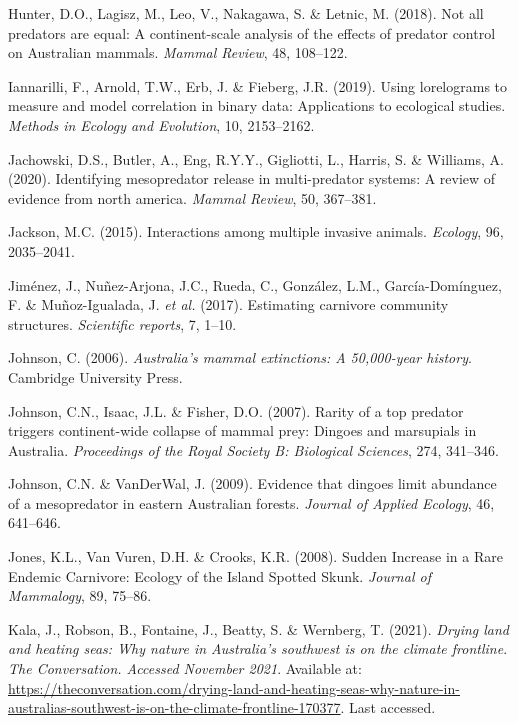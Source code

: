 \documentclass[11pt,a4paper,titlepage,twoside,openright]{style/unimelbthesis}
\begin{document}
\begin{mainmatter}
\leavevmode\hypertarget{ref-hunter2018not}{}%
Hunter, D.O., Lagisz, M., Leo, V., Nakagawa, S. \& Letnic, M. (2018). Not all predators are equal: A continent-scale analysis of the effects of predator control on Australian mammals. \emph{Mammal Review}, 48, 108--122.

\leavevmode\hypertarget{ref-iannarilli2019lorelograms}{}%
Iannarilli, F., Arnold, T.W., Erb, J. \& Fieberg, J.R. (2019). Using lorelograms to measure and model correlation in binary data: Applications to ecological studies. \emph{Methods in Ecology and Evolution}, 10, 2153--2162.

\leavevmode\hypertarget{ref-jachowski2020identifying}{}%
Jachowski, D.S., Butler, A., Eng, R.Y.Y., Gigliotti, L., Harris, S. \& Williams, A. (2020). Identifying mesopredator release in multi-predator systems: A review of evidence from north america. \emph{Mammal Review}, 50, 367--381.

\leavevmode\hypertarget{ref-jackson2015interactions}{}%
Jackson, M.C. (2015). Interactions among multiple invasive animals. \emph{Ecology}, 96, 2035--2041.

\leavevmode\hypertarget{ref-jimenez2017estimating}{}%
Jiménez, J., Nuñez-Arjona, J.C., Rueda, C., González, L.M., García-Domínguez, F. \& Muñoz-Igualada, J. \emph{et al.} (2017). Estimating carnivore community structures. \emph{Scientific reports}, 7, 1--10.

\leavevmode\hypertarget{ref-johnson2006australia}{}%
Johnson, C. (2006). \emph{Australia's mammal extinctions: A 50,000-year history}. Cambridge University Press.

\leavevmode\hypertarget{ref-johnson2007rarity}{}%
Johnson, C.N., Isaac, J.L. \& Fisher, D.O. (2007). Rarity of a top predator triggers continent-wide collapse of mammal prey: Dingoes and marsupials in Australia. \emph{Proceedings of the Royal Society B: Biological Sciences}, 274, 341--346.

\leavevmode\hypertarget{ref-johnson2009evidence}{}%
Johnson, C.N. \& VanDerWal, J. (2009). Evidence that dingoes limit abundance of a mesopredator in eastern Australian forests. \emph{Journal of Applied Ecology}, 46, 641--646.

\leavevmode\hypertarget{ref-jones2008sudden}{}%
Jones, K.L., Van Vuren, D.H. \& Crooks, K.R. (2008). Sudden Increase in a Rare Endemic Carnivore: Ecology of the Island Spotted Skunk. \emph{Journal of Mammalogy}, 89, 75--86.

\leavevmode\hypertarget{ref-drying2021kala}{}%
Kala, J., Robson, B., Fontaine, J., Beatty, S. \& Wernberg, T. (2021). \emph{Drying land and heating seas: Why nature in Australia's southwest is on the climate frontline}. \emph{The Conversation. Accessed November 2021}. Available at: \url{https://theconversation.com/drying-land-and-heating-seas-why-nature-in-australias-southwest-is-on-the-climate-frontline-170377}. Last accessed.


\end{mainmatter}
\end{document}

